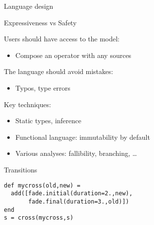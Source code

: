 \documentclass{beamer}
\begin{document}
\begin{frame}{Language design}

\begin{block}{Expressiveness vs Safety}

Users should have access to the model:
\begin{itemize}
\item Compose an operator with any sources
\end{itemize}

The language should avoid mistakes:
\begin{itemize}
\item Typos, type errors
\end{itemize}

Key techniques:
\begin{itemize}
\item Static types, inference
\item Functional language: immutability by default
\item Various analyses: fallibility, branching, \ldots
\end{itemize}

\end{block}

\end{frame}


\begin{frame}[fragile]{Transitions}

 \begin{center}
\end{center}

\vfill
\pause

\begin{lstlisting}
def mycross(old,new) =
  add([fade.initial(duration=2.,new),
       fade.final(duration=3.,old)])
end
s = cross(mycross,s)
\end{lstlisting}

\end{frame}
\end{document}
